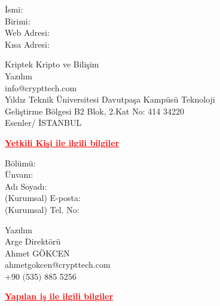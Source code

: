 \documentclass[12pt]{article}
\begin{document}
\begin{minipage}[t]{.3\textwidth}
  \begin{flushright}
      İsmi: \\
      Birimi: \\
      Web Adresi: \\
      Kısa Adresi:
  \end{flushright}
\end{minipage}%
\hspace{0.5cm}
\begin{minipage}[t]{.7\textwidth}
  Kriptek Kripto ve Bilişim \\
  Yazılım \\
  info@crypttech.com \\
  Yıldız Teknik Üniversitesi Davutpaşa Kampüsü Teknoloji \\
  Geliştirme Bölgesi B2 Blok, 2.Kat No: 414 34220 \\
  Esenler/ İSTANBUL
\end{minipage}

\newpage
    {\centering
  \textcolor{red}{\bfseries \ul{Yetkili Kişi ile ilgili bilgiler}}
  \\[1\baselineskip]
  \par}

\begin{minipage}[t]{.3\textwidth}
  \begin{flushright}
      Bölümü: \\
      Ünvanı: \\
      Adı Soyadı: \\
      (Kurumsal) E-posta: \\
      (Kurumsal) Tel. No:
  \end{flushright}
\end{minipage}%
\hspace{0.5cm}
\begin{minipage}[t]{.7\textwidth}
  Yazılım \\
  Arge Direktörü \\
  Ahmet GÖKCEN \\
  ahmetgokcen@crypttech.com \\
  +90 $($535$)$ 885 5256 \\[2\baselineskip]
\end{minipage}

{\centering
  \textcolor{red}{\bfseries \ul{Yapılan i\c{s} ile ilgili bilgiler}}
  \\[1\baselineskip]
  \par}
\end{document}
